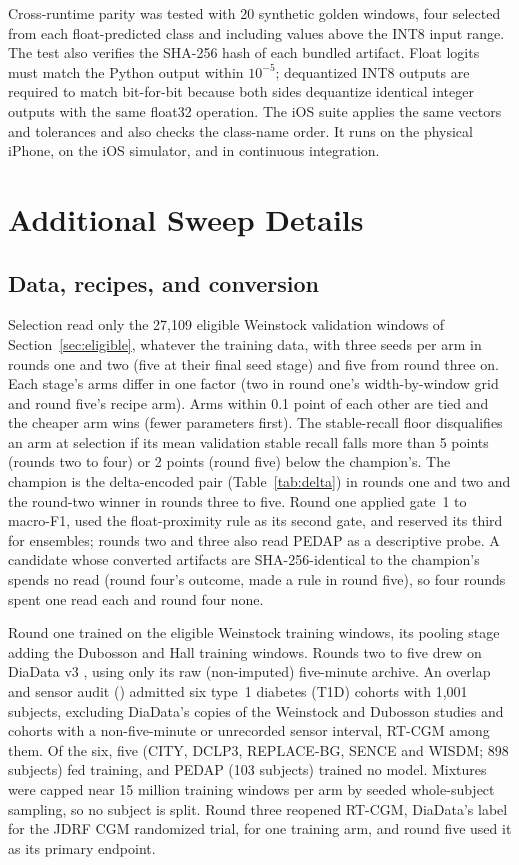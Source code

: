 \documentclass[10pt,twocolumn]{article}
\begin{document}
Cross-runtime parity was tested with 20 synthetic golden windows, four
selected from each float-predicted class and including values above the
INT8 input range. The test also verifies the SHA-256 hash of each bundled
artifact. Float logits must match the Python output within $10^{-5}$;
dequantized INT8 outputs are required to match bit-for-bit because both
sides dequantize identical integer outputs with the same float32
operation. The iOS suite applies the same vectors and tolerances and also
checks the class-name order. It runs on the physical iPhone, on the iOS
simulator, and in continuous integration.

\section{Additional Sweep Details}
\label{app:sweepdetails}

\subsection{Data, recipes, and conversion}

Selection read only the 27,109 eligible Weinstock validation windows of
Section~\ref{sec:eligible}, whatever the training data, with three seeds
per arm in rounds one and two (five at their final seed stage) and five
from round three on. Each stage's arms differ in one factor (two in round
one's width-by-window grid and round five's recipe arm). Arms within 0.1
point of each other are tied and the cheaper arm wins (fewer parameters
first). The stable-recall floor disqualifies an arm at selection if its
mean validation stable recall falls more than 5 points (rounds two to
four) or 2 points (round five) below the champion's. The champion is the
delta-encoded pair (Table~\ref{tab:delta}) in rounds one and two and the
round-two winner in rounds three to five. Round one applied gate~1 to
macro-F1, used the float-proximity rule as its second gate, and reserved
its third for ensembles; rounds two and three also read PEDAP as a
descriptive probe. A candidate whose converted artifacts are
SHA-256-identical to the champion's spends no read (round four's outcome,
made a rule in round five), so four rounds spent one read each and round
four none.

Round one trained on the eligible Weinstock training windows, its pooling
stage adding the Dubosson and Hall training windows. Rounds two to five
drew on DiaData v3 \cite{cinar2026diadata}, using only its raw
(non-imputed) five-minute archive. An overlap and sensor audit
() admitted six type~1 diabetes (T1D) cohorts
with 1,001 subjects, excluding DiaData's copies of the Weinstock and
Dubosson studies and cohorts with a non-five-minute or unrecorded sensor
interval, RT-CGM among them. Of the six, five (CITY, DCLP3, REPLACE-BG,
SENCE and WISDM; 898 subjects) fed training, and PEDAP (103 subjects)
trained no model. Mixtures were capped near 15 million training windows
per arm by seeded whole-subject sampling, so no subject is split. Round
three reopened RT-CGM, DiaData's label for the JDRF CGM randomized trial,
for one training arm, and round five used it as its primary endpoint.
\end{document}

